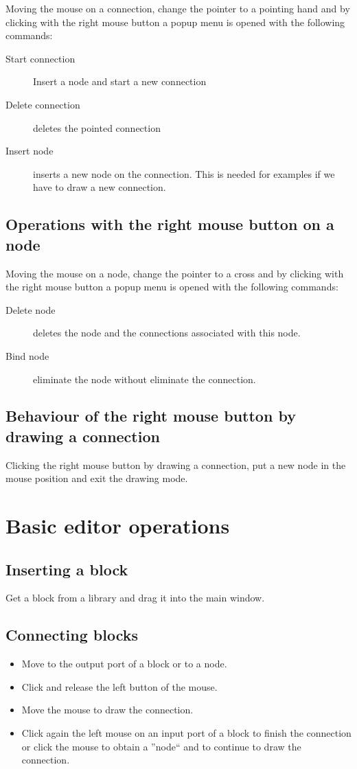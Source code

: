 Moving the mouse on a connection, change the pointer to a pointing hand and by 
clicking with the right mouse button a popup menu is opened with the following 
commands:

\begin{description}
\item[Start connection] Insert a node and start a new connection
\item[Delete connection] deletes the pointed connection
\item [Insert node] inserts a new node on the connection. This is needed for 
examples if we have to draw a new connection.
\end{description}

\subsection{Operations with the right mouse button on a node}

Moving the mouse on a node, change the pointer to a cross and by 
clicking with the right mouse button a popup menu is opened with the following 
commands:

\begin{description}
\item[Delete node] deletes the node and the connections associated with this 
node.
\item [Bind node] eliminate the node without eliminate the connection.
\end{description}

\subsection{Behaviour of the right mouse button by drawing a connection}
Clicking the right mouse button by drawing a connection, put a new node in the 
mouse position and exit the drawing mode.

\section{Basic editor operations}

\subsection{Inserting a block}
Get a block from a library and drag it into the main window.

\subsection{Connecting blocks}
\begin{itemize}
\item Move to the output port of a block or to a node.
\item Click and release the left button of the mouse.
\item Move the mouse to draw the connection.
\item Click again the left mouse on an input port of a block to finish the 
connection or click the mouse to obtain a ''node`` and to continue to draw the 
connection.
\end{itemize}

